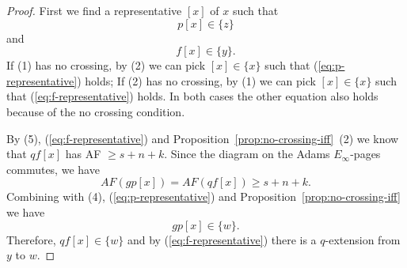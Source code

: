 \begin{proof}
    First we find a representative $[x]$ of $x$ such that
    \begin{equation}\label{eq:p-representative}
        p[x]\in \{z\}
    \end{equation}
    and
    \begin{equation}\label{eq:f-representative}
        f[x]\in \{y\}.
    \end{equation}
    If (1) has no crossing, by (2) we can pick $[x]\in \{x\}$ such that (\ref{eq:p-representative}) holds;
    If (2) has no crossing, by (1) we can pick $[x]\in \{x\}$ such that  (\ref{eq:f-representative}) holds.
    In both cases the other equation also holds because of the no crossing condition.
    
    By (5), (\ref{eq:f-representative}) and Proposition~\ref{prop:no-crossing-iff}~(2) we know that $qf[x]$ has AF $\ge s+n+k$. Since the diagram on the Adams $E_\infty$-pages commutes, we have
    $$AF(gp[x])=AF(qf[x])\ge s+n+k.$$
    Combining with (4), (\ref{eq:p-representative}) and Proposition~\ref{prop:no-crossing-iff} we have
    $$gp[x]\in \{w\}.$$
    Therefore, $qf[x]\in \{w\}$ and by (\ref{eq:f-representative}) there is a $q$-extension from $y$ to $w$.
\end{proof}

